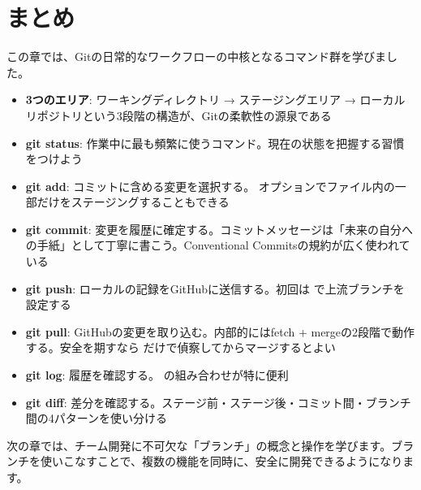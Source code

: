 \section{まとめ}

この章では、Gitの日常的なワークフローの中核となるコマンド群を学びました。

\begin{itemize}
  \item \textbf{3つのエリア}: ワーキングディレクトリ → ステージングエリア → ローカルリポジトリという3段階の構造が、Gitの柔軟性の源泉である
  \item \textbf{git status}: 作業中に最も頻繁に使うコマンド。現在の状態を把握する習慣をつけよう
  \item \textbf{git add}: コミットに含める変更を選択する。 オプションでファイル内の一部だけをステージングすることもできる
  \item \textbf{git commit}: 変更を履歴に確定する。コミットメッセージは「未来の自分への手紙」として丁寧に書こう。Conventional Commitsの規約が広く使われている
  \item \textbf{git push}: ローカルの記録をGitHubに送信する。初回は  で上流ブランチを設定する
  \item \textbf{git pull}: GitHubの変更を取り込む。内部的にはfetch + mergeの2段階で動作する。安全を期すなら  だけで偵察してからマージするとよい
  \item \textbf{git log}: 履歴を確認する。 の組み合わせが特に便利
  \item \textbf{git diff}: 差分を確認する。ステージ前・ステージ後・コミット間・ブランチ間の4パターンを使い分ける
\end{itemize}

次の章では、チーム開発に不可欠な「ブランチ」の概念と操作を学びます。ブランチを使いこなすことで、複数の機能を同時に、安全に開発できるようになります。
